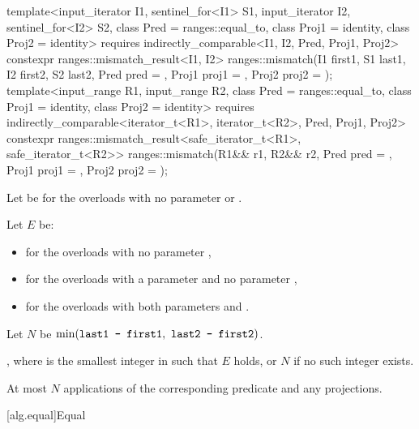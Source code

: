 \begin{itemdecl}
template<input_iterator I1, sentinel_for<I1> S1, input_iterator I2, sentinel_for<I2> S2,
         class Pred = ranges::equal_to, class Proj1 = identity, class Proj2 = identity>
  requires indirectly_comparable<I1, I2, Pred, Proj1, Proj2>
  constexpr ranges::mismatch_result<I1, I2>
    ranges::mismatch(I1 first1, S1 last1, I2 first2, S2 last2, Pred pred = {},
                     Proj1 proj1 = {}, Proj2 proj2 = {});
template<input_range R1, input_range R2,
         class Pred = ranges::equal_to, class Proj1 = identity, class Proj2 = identity>
  requires indirectly_comparable<iterator_t<R1>, iterator_t<R2>, Pred, Proj1, Proj2>
  constexpr ranges::mismatch_result<safe_iterator_t<R1>, safe_iterator_t<R2>>
    ranges::mismatch(R1&& r1, R2&& r2, Pred pred = {},
                     Proj1 proj1 = {}, Proj2 proj2 = {});
\end{itemdecl}

\begin{itemdescr}
\pnum
Let  be 
for the overloads with no parameter  or .

\pnum
Let $E$ be:
\begin{itemize}
\setlength{\emergencystretch}{1em}
\item
  for the overloads with no parameter ,
\item
  for the overloads with a parameter  and
  no parameter ,
\item
  for the overloads with both parameters  and .
\end{itemize}

\pnum
Let $N$ be $\min(\tcode{last1 - first1}, \ \tcode{last2 - first2})$.

\pnum
\returns
{},
where  is the smallest integer in  such that $E$ holds,
or $N$ if no such integer exists.

\pnum
\complexity
At most $N$ applications of the corresponding predicate and any projections.
\end{itemdescr}

[alg.equal]{Equal}

